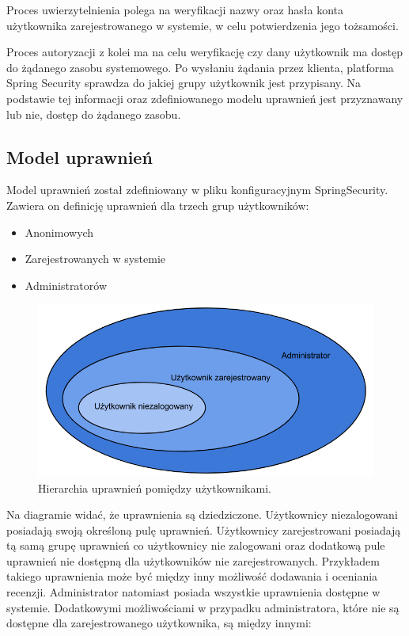 Proces uwierzytelnienia polega na weryfikacji nazwy oraz hasła konta użytkownika zarejestrowanego w systemie, w celu potwierdzenia jego tożsamości. 

Proces autoryzacji z kolei ma na celu weryfikację czy dany użytkownik ma dostęp do żądanego zasobu systemowego. Po wysłaniu żądania przez klienta, platforma Spring Security sprawdza do jakiej grupy użytkownik jest przypisany. Na podstawie tej informacji oraz zdefiniowanego modelu uprawnień jest przyznawany lub nie, dostęp do żądanego zasobu.

\subsection{Model uprawnień}

Model uprawnień został zdefiniowany w pliku konfiguracyjnym SpringSecurity. Zawiera on definicję uprawnień dla  trzech grup użytkowników:

\begin{itemize}
\item Anonimowych
\item Zarejestrowanych w systemie
\item Administratorów
\end{itemize}

\begin{figure}[h]
	\centering
	\includegraphics[scale=0.5]{images/hierarchia_uprawnien.png}
	\caption{Hierarchia uprawnień pomiędzy użytkownikami.}
\end{figure}

Na diagramie widać, że uprawnienia są dziedziczone. Użytkownicy niezalogowani posiadają swoją określoną pulę uprawnień. Użytkownicy zarejestrowani posiadają tą samą grupę uprawnień co użytkownicy nie zalogowani oraz dodatkową pule uprawnień nie dostępną dla użytkowników nie zarejestrowanych. Przykładem takiego uprawnienia może być między inny możliwość dodawania i oceniania recenzji. Administrator natomiast posiada wszystkie uprawnienia dostępne w systemie. Dodatkowymi możliwościami w przypadku administratora, które nie są dostępne dla zarejestrowanego użytkownika, są między innymi:


